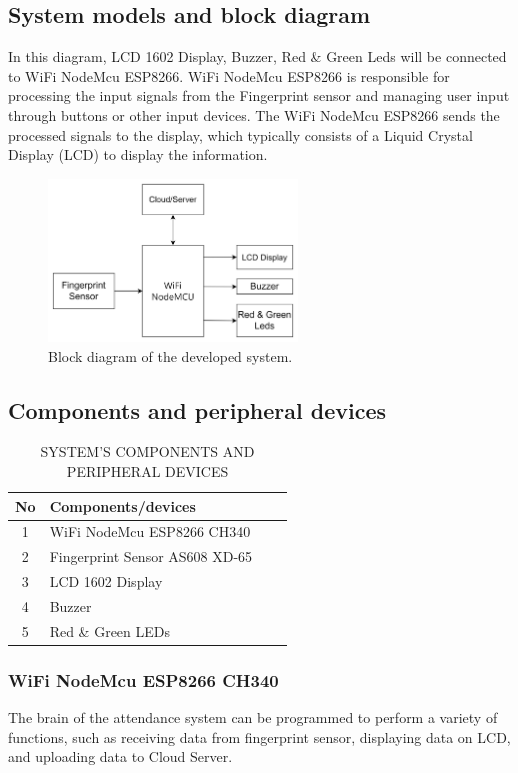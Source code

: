 \documentclass[conference, doublecolumn]{IEEEtran}
\begin{document}
\subsection{System models and block diagram}
In this diagram, LCD 1602 Display, Buzzer, Red \& Green Leds will be connected to WiFi NodeMcu ESP8266. WiFi NodeMcu ESP8266 is responsible for processing the input signals from the Fingerprint sensor and managing user input through buttons or other input devices. The WiFi NodeMcu ESP8266 sends the processed signals to the display, which typically consists of a Liquid Crystal Display (LCD) to display the information. 
\begin{figure}[htbp]
\centering\includegraphics[width=2.6in]{block_diagram.jpg}
\caption{Block diagram of the developed system.}
\label{fig}
\end{figure}
\subsection{Components and peripheral devices}
\begin{table}[htbp]
\caption{SYSTEM’S COMPONENTS AND PERIPHERAL DEVICES}
\begin{center}
\begin{tabular}{|c|l|l|c|}
\hline
\textbf{No}&\textbf{Components/devices}  \\
\hline
1 & WiFi NodeMcu ESP8266 CH340  \\
\hline
2 & Fingerprint Sensor AS608 XD-65\\
\hline
3 & LCD 1602 Display \\
\hline
4 & Buzzer \\
\hline
5 & Red \& Green LEDs \\
\hline
\end{tabular}
\label{tab1}

\end{center}
\end{table}
\subsubsection{WiFi NodeMcu ESP8266 CH340}
The brain of the attendance system can be programmed to perform a variety of functions, such as receiving data from fingerprint sensor, displaying data on LCD, and uploading data to Cloud Server. 
\end{document}
